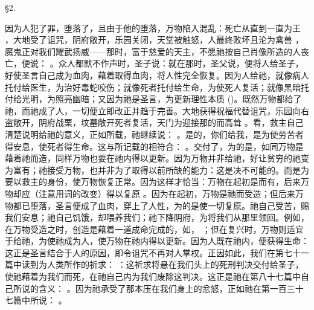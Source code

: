 §2. \par

因为人犯了罪，堕落了，且由于他的堕落，万物陷入混乱：死亡从直到一直为王 ，大地受了诅咒，阴府敞开，乐园关闭，天堂被触怒，人最终败坏且沦为禽兽 ，魔鬼正对我们耀武扬威——那时，富于慈爱的天主，不愿祂按自己肖像所造的人丧亡，便说： 。众人都默不作声时，圣子说：就在那时，圣父说，便将人给圣子，好使圣言自己成为血肉，藉着取得血肉，将人性完全恢复。因为人给祂，就像病人托付给医生，为治好毒蛇咬伤；就像死者托付给生命，为使死人复活；就像黑暗托付给光明，为照亮幽暗；又因为祂是圣言，为更新理性本质 ()。既然万物都给了祂，而祂成了人，一切便立即改正并趋于完善。大地获得祝福代替诅咒，乐园向右盗敞开，阴府战栗，坟墓敞开死者复活，天门为迎接那的而高耸 。看，救主自己清楚说明给祂的意义，正如所载，祂继续说： 。是的，你们给我，是为使劳苦者得安息，使死者得生命。这与所记载的相符合： 。交付了，为的是，如同万物是藉着祂而造，同样万物也要在祂内得以更新。因为万物并非给祂，好让贫穷的祂变为富有；祂接受万物，也并非为了取得以前所缺的能力：这是决不可能的。而是为要以救主的身份，使万物恢复正常。因为这样才恰当：万物在起初是而有，后来万物却应（注意用词的改变）得以复原 。因为在起初，万物是祂而受造；但后来万物都已堕落，圣言便成了血肉，穿上了人性，为的是使一切复原。祂自己受苦，赐我们安息；祂自己饥饿，却喂养我们；祂下降阴府，为将我们从那里领回。例如，在万物受造之时，创造是藉着一道成命完成的，如， ；但在复兴时，万物则适宜于给祂，为使祂成为人，使万物在祂内得以更新。因为人既在祂内，便获得生命：这正是圣言结合于人的原因，即令诅咒不再对人掌权。正因如此，我们在第七十一篇中读到为人类所作的祈求： ：这祈求将悬在我们头上的死刑判决交付给圣子，使祂藉着为我们而死，在祂自己内为我们废除这判决。这正是祂在第八十七篇中自己所说的含义： 。因为祂承受了那本压在我们身上的忿怒，正如祂在第一百三十七篇中所说： 。\par


